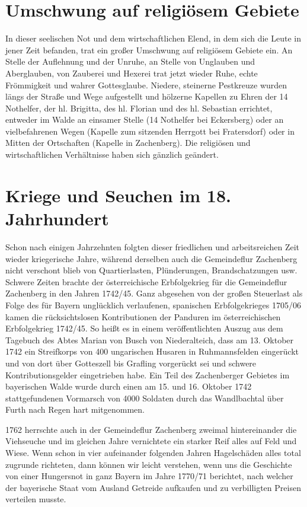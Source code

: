 \documentclass[12pt,a4pager]{book}
\begin{document}
\section{Umschwung auf religiösem Gebiete}

In dieser seelischen Not und dem wirtschaftlichen Elend, in dem sich die Leute
in jener Zeit befanden, trat ein großer Umschwung auf religiösem Gebiete ein. An
Stelle der Auflehnung und der Unruhe, an Stelle von Unglauben und Aberglauben,
von Zauberei und Hexerei trat jetzt wieder Ruhe, echte Frömmigkeit und wahrer
Gottesglaube. Niedere, steinerne Pestkreuze wurden längs der Straße und Wege
aufgestellt und hölzerne Kapellen zu Ehren der 14 Nothelfer, der hl. Brigitta,
des hl. Florian und des hl. Sebastian errichtet, entweder im Walde an einsamer
Stelle (14 Nothelfer bei Eckersberg) oder an vielbefahrenen Wegen (Kapelle zum
sitzenden Herrgott bei Fratersdorf) oder in Mitten der Ortschaften (Kapelle in
Zachenberg). Die religiösen und wirtschaftlichen Verhältnisse haben sich
gänzlich geändert.

\section{Kriege und Seuchen im 18. Jahrhundert}

Schon nach einigen Jahrzehnten folgten dieser friedlichen und arbeitsreichen
Zeit wieder kriegerische Jahre, während derselben auch die Gemeindeflur
Zachenberg nicht verschont blieb von Quartierlasten, Plünderungen,
Brandschatzungen usw. Schwere Zeiten brachte der österreichische Erbfolgekrieg
für die Gemeindeflur Zachenberg in den Jahren 1742/45. Ganz abgesehen von der
großen Steuerlast als Folge des für Bayern unglücklich verlaufenen, spanischen
Erbfolgekrieges 1705/06 kamen die rücksichtslosen Kontributionen der Panduren im
österreichischen Erbfolgekrieg 1742/45. So heißt es in einem veröffentlichten
Auszug aus dem Tagebuch des Abtes Marian von Busch von Niederalteich, dass am
13. Oktober 1742 ein Streifkorps von 400 ungarischen Husaren in Ruhmannsfelden
eingerückt und von dort über Gotteszell bis Grafling vorgerückt sei und schwere
Kontributionsgelder eingetrieben habe. Ein Teil des Zachenberger Gebietes im
bayerischen Walde wurde durch einen am 15. und 16. Oktober 1742 stattgefundenen
Vormarsch von 4000 Soldaten durch das Wandlbachtal über Furth nach Regen hart
mitgenommen.

1762 herrschte auch in der Gemeindeflur Zachenberg zweimal hintereinander die
Viehseuche und im gleichen Jahre vernichtete ein starker Reif alles auf Feld und
Wiese. Wenn schon in vier aufeinander folgenden Jahren Hagelschäden alles total
zugrunde richteten, dann können wir leicht verstehen, wenn uns die Geschichte
von einer Hungersnot in ganz Bayern im Jahre 1770/71 berichtet, nach welcher der
bayerische Staat vom Ausland Getreide aufkaufen und zu verbilligten Preisen
verteilen musste.
\end{document}
